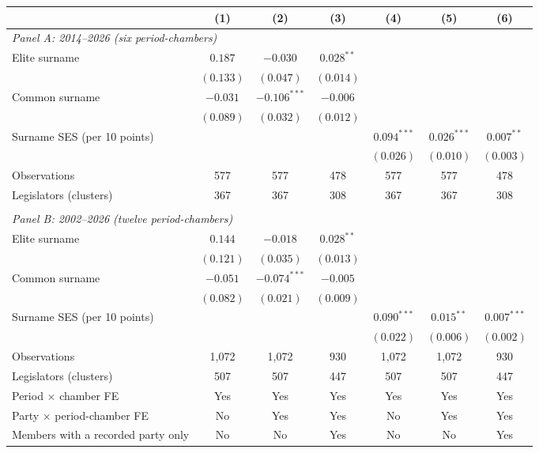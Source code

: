 \begin{tabular}{lcccccc}
\toprule
 & (1) & (2) & (3) & (4) & (5) & (6) \\
\midrule
\multicolumn{7}{l}{\textit{Panel A: 2014--2026 (six period-chambers)}} \\
\midrule
Elite surname & $0.187$ & $-0.030$ & $0.028^{**}$ &  &  &  \\
 & $(0.133)$ & $(0.047)$ & $(0.014)$ &  &  &  \\
Common surname & $-0.031$ & $-0.106^{***}$ & $-0.006$ &  &  &  \\
 & $(0.089)$ & $(0.032)$ & $(0.012)$ &  &  &  \\
Surname SES (per 10 points) &  &  &  & $0.094^{***}$ & $0.026^{***}$ & $0.007^{**}$ \\
 &  &  &  & $(0.026)$ & $(0.010)$ & $(0.003)$ \\
Observations & 577 & 577 & 478 & 577 & 577 & 478 \\
Legislators (clusters) & 367 & 367 & 308 & 367 & 367 & 308 \\
\\[-0.6em]
\multicolumn{7}{l}{\textit{Panel B: 2002--2026 (twelve period-chambers)}} \\
\midrule
Elite surname & $0.144$ & $-0.018$ & $0.028^{**}$ &  &  &  \\
 & $(0.121)$ & $(0.035)$ & $(0.013)$ &  &  &  \\
Common surname & $-0.051$ & $-0.074^{***}$ & $-0.005$ &  &  &  \\
 & $(0.082)$ & $(0.021)$ & $(0.009)$ &  &  &  \\
Surname SES (per 10 points) &  &  &  & $0.090^{***}$ & $0.015^{**}$ & $0.007^{***}$ \\
 &  &  &  & $(0.022)$ & $(0.006)$ & $(0.002)$ \\
Observations & 1,072 & 1,072 & 930 & 1,072 & 1,072 & 930 \\
Legislators (clusters) & 507 & 507 & 447 & 507 & 507 & 447 \\
\midrule
Period $\times$ chamber FE & Yes & Yes & Yes & Yes & Yes & Yes \\
Party $\times$ period-chamber FE & No & Yes & Yes & No & Yes & Yes \\
Members with a recorded party only & No & No & Yes & No & No & Yes \\
\bottomrule
\end{tabular}
